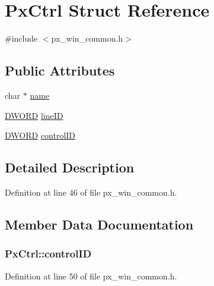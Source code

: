\hypertarget{struct_px_ctrl}{}\section{Px\+Ctrl Struct Reference}
\label{struct_px_ctrl}


{\ttfamily \#include $<$px\+\_\+win\+\_\+common.\+h$>$}

\subsection*{Public Attributes}
\begin{DoxyCompactItemize}
\item 
char $\ast$ \hyperlink{struct_px_ctrl_ae94c512ee6d6ebe5d74a2bb80f13cbfd}{name}
\item 
\hyperlink{mapinls_8h_ad342ac907eb044443153a22f964bf0af}{D\+W\+O\+RD} \hyperlink{struct_px_ctrl_a80a9f840fab08416ee0c9356ac7eb2a3}{line\+ID}
\item 
\hyperlink{mapinls_8h_ad342ac907eb044443153a22f964bf0af}{D\+W\+O\+RD} \hyperlink{struct_px_ctrl_aa4b229b3007dd033a8189ab5b704a2e1}{control\+ID}
\end{DoxyCompactItemize}


\subsection{Detailed Description}


Definition at line 46 of file px\+\_\+win\+\_\+common.\+h.



\subsection{Member Data Documentation}
\subsubsection[{\texorpdfstring{control\+ID}{controlID}}]{ Px\+Ctrl\+::control\+ID}\hypertarget{struct_px_ctrl_aa4b229b3007dd033a8189ab5b704a2e1}{}\label{struct_px_ctrl_aa4b229b3007dd033a8189ab5b704a2e1}


Definition at line 50 of file px\+\_\+win\+\_\+common.\+h.

